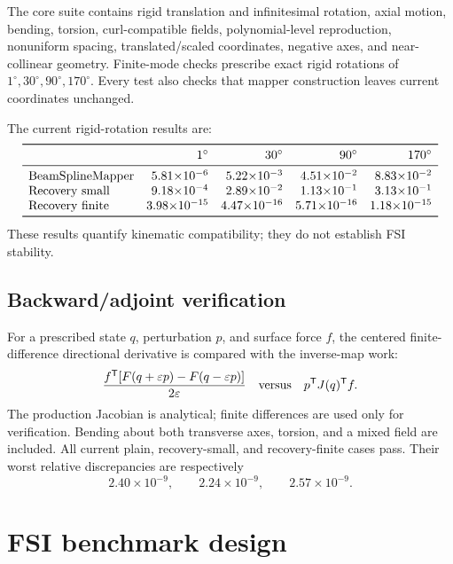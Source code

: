 \documentclass[11pt,a4paper]{article}
\newcommand{\T}{\mathsf{T}}
\begin{document}
The core suite contains rigid translation and infinitesimal rotation, axial
motion, bending, torsion, curl-compatible fields, polynomial-level
reproduction, nonuniform spacing, translated/scaled coordinates, negative
axes, and near-collinear geometry.  Finite-mode checks prescribe exact rigid
rotations of \(1^\circ,30^\circ,90^\circ,170^\circ\).  Every test also checks
that mapper construction leaves current coordinates unchanged.

The current rigid-rotation results are:
\[
\begin{array}{lrrrr}
\toprule
&1^\circ&30^\circ&90^\circ&170^\circ\\
\midrule
\text{BeamSplineMapper}
&5.81{\times}10^{-6}&5.22{\times}10^{-3}
&4.51{\times}10^{-2}&8.83{\times}10^{-2}\\
\text{Recovery small}
&9.18{\times}10^{-4}&2.89{\times}10^{-2}
&1.13{\times}10^{-1}&3.13{\times}10^{-1}\\
\text{Recovery finite}
&3.98{\times}10^{-15}&4.47{\times}10^{-16}
&5.71{\times}10^{-16}&1.18{\times}10^{-15}\\
\bottomrule
\end{array}
\]
These results quantify kinematic compatibility; they do not establish FSI
stability.

\subsection{Backward/adjoint verification}

For a prescribed state \(q\), perturbation \(p\), and surface force \(f\), the
centered finite-difference directional derivative is compared with the
inverse-map work:
\[
 \frac{f^\T[F(q+\varepsilon p)-F(q-\varepsilon p)]}{2\varepsilon}
 \quad\hbox{versus}\quad
 p^\T J(q)^\T f.
\]
The production Jacobian is analytical; finite differences are used only for
verification.  Bending about both transverse axes, torsion, and a mixed field
are included.  All current plain, recovery-small, and recovery-finite cases
pass.  Their worst relative discrepancies are respectively
\[
  2.40\times10^{-9},\qquad
  2.24\times10^{-9},\qquad
  2.57\times10^{-9}.
\]

\section{FSI benchmark design}
\end{document}
